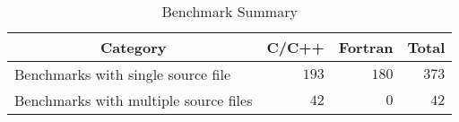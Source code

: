 \begin{table}[htp]
\caption{Benchmark Summary}
\label{Ta:benchmark_summary}
\begin{center}

\def\arraystretch{1.1}
\setlength\tabcolsep{7pt}

\begin{tabular}{|l|r|r|r|}
\hline

\multicolumn{1}{|c|}{\textbf{Category}} & \multicolumn{1}{|c|}{\textbf{C/C++}} & \multicolumn{1}{|c|}{\textbf{Fortran}} & \multicolumn{1}{|c|}{\textbf{Total}} \\ \hline \hline
Benchmarks with single source file & $193$ & $180$ & $373$ \\ \hline
Benchmarks with multiple source files & $42$ & $0$ & $42$ \\ \hline

\end{tabular}

\end{center}
\end{table}
